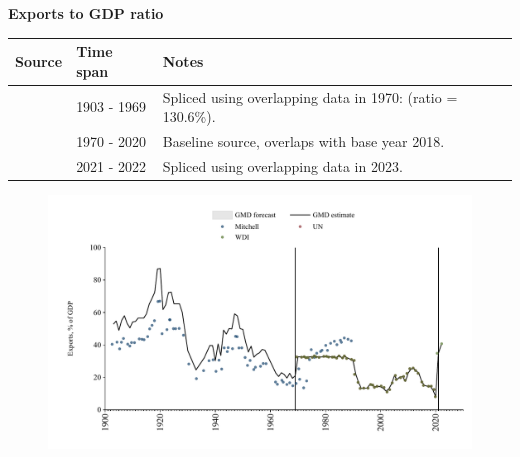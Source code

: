 \documentclass[12pt,a4paper,landscape]{article}
\begin{document}
\begin{adjustbox}{max totalsize={\paperwidth}{\paperheight},center}
\begin{minipage}[t][\textheight][t]{\textwidth}
\vspace*{0.5cm}
{}
\begin{center}
{\Large\bfseries Exports to GDP ratio}
\end{center}
\vspace{0.5cm}
\begin{table}[H]
\centering
\small
\begin{tabular}{|l|l|l|}
\hline
\textbf{Source} & \textbf{Time span} & \textbf{Notes} \\
\hline
\rowcolor{white}\cite{Mitchell}& 1903 - 1969 &Spliced using overlapping data in 1970: (ratio = 130.6\%). \\
\rowcolor{lightgray}\cite{UN}& 1970 - 2020 &Baseline source, overlaps with base year 2018. \\
\rowcolor{white}\cite{WDI}& 2021 - 2022 &Spliced using overlapping data in 2023. \\
\hline
\end{tabular}
\end{table}
\begin{figure}[H]
\centering
\includegraphics[width=\textwidth,height=0.6\textheight,keepaspectratio]{graphs/CUB_exports_GDP.pdf}
\end{figure}
\end{minipage}
\end{adjustbox}
\end{document}

